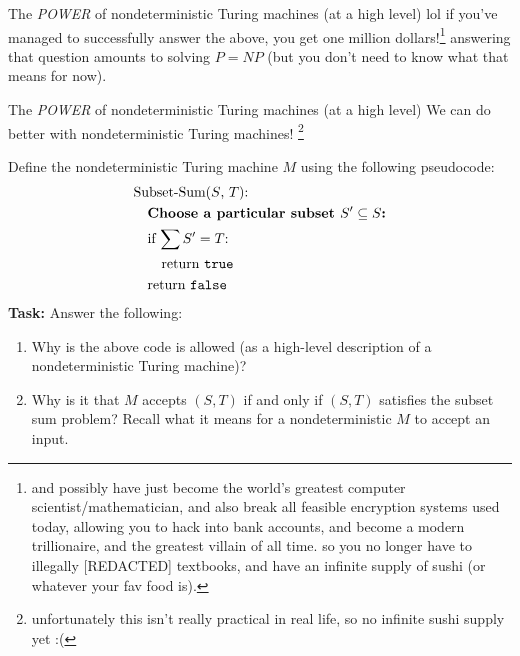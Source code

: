 \documentclass{beamer}
\begin{document}
\begin{frame}{The \textit{POWER} of nondeterministic Turing machines (at a high level)}
lol if you've managed to successfully answer the above, you get one million dollars!\footnote{and possibly have just become the world's greatest computer scientist/mathematician, and also break all feasible encryption systems used today, allowing you to hack into bank accounts, and become a modern trillionaire, and the greatest villain of all time. so you no longer have to illegally [REDACTED] textbooks, and have an infinite supply of sushi \emojisushi \emojisushi \emojisushi (or whatever your fav food is).} answering that question amounts to solving $P = NP$ (but you don't need to know what that means for now).
 
\end{frame}

\begin{frame}{The \textit{POWER} of nondeterministic Turing machines (at a high level)}
We can do better with nondeterministic Turing machines! \footnote{unfortunately this isn't really practical in real life, so no infinite sushi supply yet :(}

Define the nondeterministic Turing machine $M$ using the following pseudocode:
\begin{align*}
& \text{Subset-Sum($S$, $T$):}\\
& \quad \textbf{Choose a particular subset $S' \subseteq S$:}\\
& \quad \text{if $\sum S' = T$: }\\
& \quad \quad \text{return \texttt{true}}\\
& \quad\text{return \texttt{false}}
\end{align*}
\textbf{Task:} Answer the following:
\begin{enumerate}
\item \small{}Why is the above code is allowed (as a high-level description of a nondeterministic Turing machine)?
\item Why is it that $M$ accepts $(S, T)$ if and only if $(S, T)$ satisfies the subset sum problem? Recall what it means for a nondeterministic $M$ to accept an input.
\end{enumerate}

\end{frame}
\end{document}
